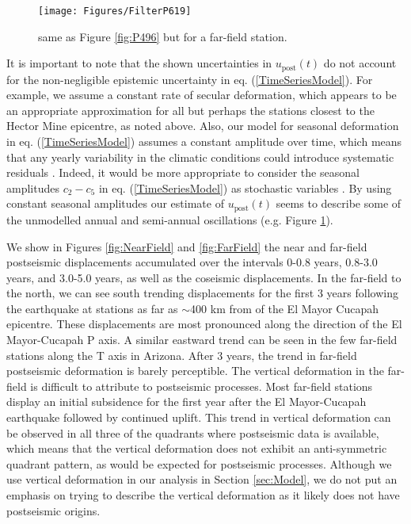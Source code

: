 \documentclass[review]{elsarticle}
\begin{document}
\begin{figure}
\texttt{[image: Figures/FilterP619]}
\centering
\caption{same as Figure \ref{fig:P496} but for a far-field station.} 
\label{fig:P619}
\end{figure}

It is important to note that the shown uncertainties in $u_\mathrm{post}(t)$ do not account for the non-negligible epistemic uncertainty in eq. (\ref{TimeSeriesModel}).  For example, we assume a constant rate of secular deformation, which appears to be an appropriate approximation for all but perhaps the stations closest to the Hector Mine epicentre, as noted above.  Also, our model for seasonal deformation in eq. (\ref{TimeSeriesModel}) assumes a constant amplitude over time, which means that any yearly variability in the climatic conditions could introduce systematic residuals \citep{Davis2012}. Indeed, it would be more appropriate to consider the seasonal amplitudes $c_2-c_5$ in eq. (\ref{TimeSeriesModel}) as stochastic variables \citep{Murray2005}. By using constant seasonal amplitudes our estimate of $u_\mathrm{post}(t)$ seems to describe some of the unmodelled annual and semi-annual oscillations (e.g. Figure \ref{fig:P619}).          

We show in Figures \ref{fig:NearField} and \ref{fig:FarField} the near and far-field postseismic displacements accumulated over the intervals  0-0.8 years, 0.8-3.0 years, and 3.0-5.0 years, as well as the coseismic displacements.  In the far-field to the north, we can see south trending displacements for the first 3 years following the earthquake at stations as far as $\sim$400 km from of the El Mayor Cucapah epicentre.  These displacements are most pronounced along the direction of the El Mayor-Cucapah P axis. A similar eastward trend can be seen in the few far-field stations along the T axis in Arizona.  After 3 years, the trend in far-field postseismic deformation is barely perceptible.  The vertical deformation in the far-field is difficult to attribute to postseismic processes.  Most far-field stations display an initial subsidence for the first year after the El Mayor-Cucapah earthquake followed by continued uplift.  This trend in vertical deformation can be observed in all three of the quadrants where postseismic data is available, which means that the vertical deformation does not exhibit an anti-symmetric quadrant pattern, as would be expected for postseismic processes.  Although we use vertical deformation in our analysis in Section \ref{sec:Model},  we do not put an emphasis on trying to describe the vertical deformation as it likely does not have postseismic origins.        
\end{document}
